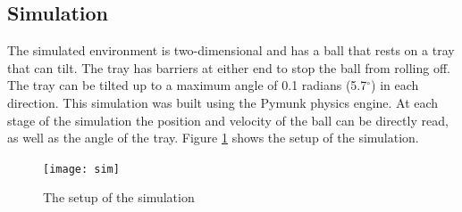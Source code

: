 \documentclass[12pt,a4paper]{article}
\begin{document}
\subsection{Simulation}
The simulated environment is two-dimensional and has a ball that rests on a tray that can tilt. The tray has barriers at either end to stop the ball from rolling off. The tray can be tilted up to a maximum angle of 0.1 radians (5.7$^\circ$) in each direction. This simulation was built using the Pymunk physics engine. At each stage of the simulation the position and velocity of the ball can be directly read, as well as the angle of the tray.  Figure \ref{sim} shows the setup of the simulation.
\begin{figure}[H]
	\centering
	\texttt{[image: sim]}
	\caption{The setup of the simulation}
	\label{sim}
\end{figure}
\end{document}
